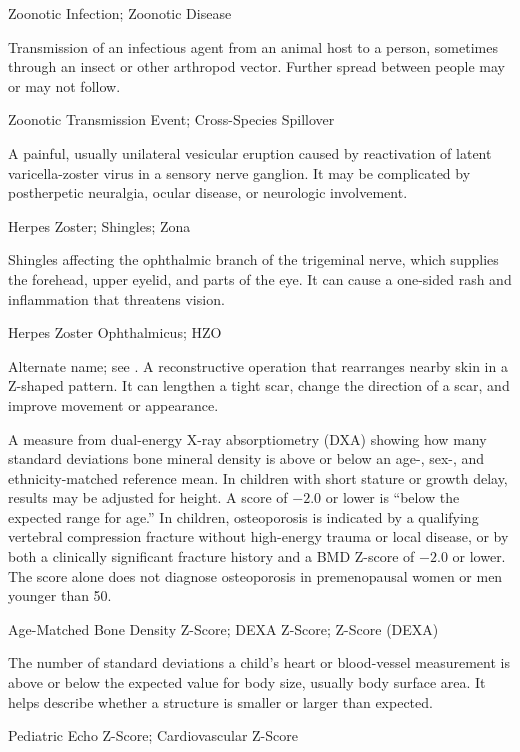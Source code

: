 \synonyms
Zoonotic Infection; Zoonotic Disease

 Transmission of an infectious agent from an animal host to a person, sometimes through an insect or other arthropod vector. Further spread between people may or may not follow.

\synonyms
Zoonotic Transmission Event; Cross-Species Spillover

 A painful, usually unilateral vesicular eruption caused by reactivation of latent varicella-zoster virus in a sensory nerve ganglion. It may be complicated by postherpetic neuralgia, ocular disease, or neurologic involvement.

\synonyms
Herpes Zoster; Shingles; Zona

 Shingles affecting the ophthalmic branch of the trigeminal nerve, which supplies the forehead, upper eyelid, and parts of the eye. It can cause a one-sided rash and inflammation that threatens vision.

\synonyms
Herpes Zoster Ophthalmicus; HZO

 Alternate name; see .
 A reconstructive operation that rearranges nearby skin in a Z-shaped pattern. It can lengthen a tight scar, change the direction of a scar, and improve movement or appearance.

 A measure from dual-energy X-ray absorptiometry (DXA) showing
how many standard deviations bone mineral density is above or below an age-, sex-, and
ethnicity-matched reference mean. In children with short stature or growth delay, results may
be adjusted for height. A score of $-2.0$ or lower is ``below the expected range for age.''
In children, osteoporosis is indicated by a qualifying vertebral compression fracture without
high-energy trauma or local disease, or by both a clinically significant fracture history and a
BMD Z-score of $-2.0$ or lower. The score alone does not diagnose osteoporosis in premenopausal
women or men younger than 50.

\synonyms
Age-Matched Bone Density Z-Score; DEXA Z-Score; Z-Score (DEXA)

 The number of standard deviations a child’s heart or blood-vessel measurement is above or below the expected value for body size, usually body surface area. It helps describe whether a structure is smaller or larger than expected.

\synonyms
Pediatric Echo Z-Score; Cardiovascular Z-Score

